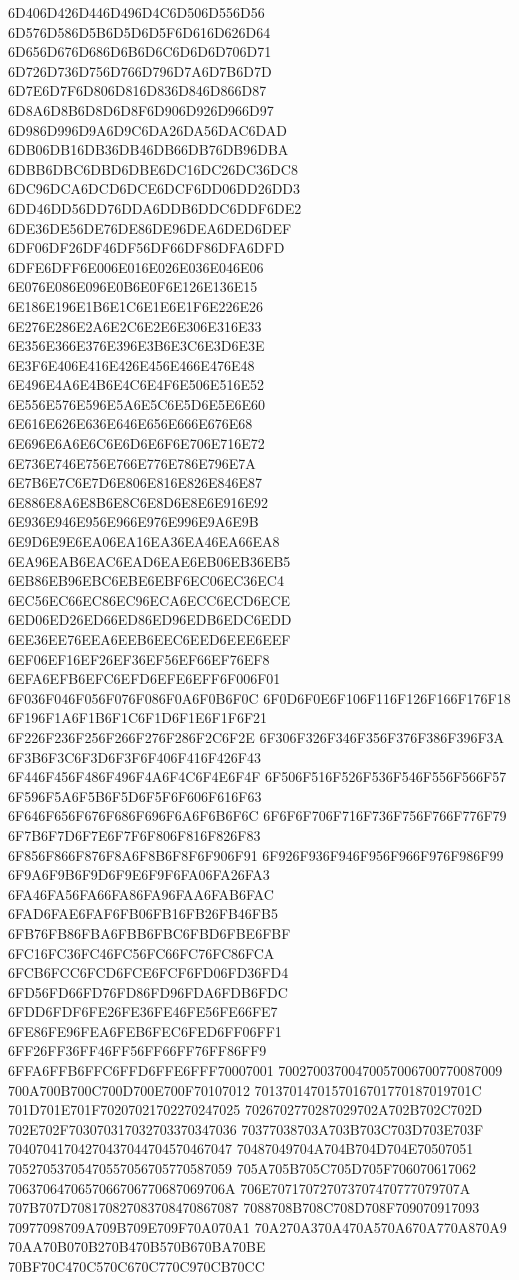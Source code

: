 6D406D426D446D496D4C6D506D556D56
6D576D586D5B6D5D6D5F6D616D626D64
6D656D676D686D6B6D6C6D6D6D706D71
6D726D736D756D766D796D7A6D7B6D7D
6D7E6D7F6D806D816D836D846D866D87
6D8A6D8B6D8D6D8F6D906D926D966D97
6D986D996D9A6D9C6DA26DA56DAC6DAD
6DB06DB16DB36DB46DB66DB76DB96DBA
6DBB6DBC6DBD6DBE6DC16DC26DC36DC8
6DC96DCA6DCD6DCE6DCF6DD06DD26DD3
6DD46DD56DD76DDA6DDB6DDC6DDF6DE2
6DE36DE56DE76DE86DE96DEA6DED6DEF
6DF06DF26DF46DF56DF66DF86DFA6DFD
6DFE6DFF6E006E016E026E036E046E06
6E076E086E096E0B6E0F6E126E136E15
6E186E196E1B6E1C6E1E6E1F6E226E26
6E276E286E2A6E2C6E2E6E306E316E33
6E356E366E376E396E3B6E3C6E3D6E3E
6E3F6E406E416E426E456E466E476E48
6E496E4A6E4B6E4C6E4F6E506E516E52
6E556E576E596E5A6E5C6E5D6E5E6E60
6E616E626E636E646E656E666E676E68
6E696E6A6E6C6E6D6E6F6E706E716E72
6E736E746E756E766E776E786E796E7A
6E7B6E7C6E7D6E806E816E826E846E87
6E886E8A6E8B6E8C6E8D6E8E6E916E92
6E936E946E956E966E976E996E9A6E9B
6E9D6E9E6EA06EA16EA36EA46EA66EA8
6EA96EAB6EAC6EAD6EAE6EB06EB36EB5
6EB86EB96EBC6EBE6EBF6EC06EC36EC4
6EC56EC66EC86EC96ECA6ECC6ECD6ECE
6ED06ED26ED66ED86ED96EDB6EDC6EDD
6EE36EE76EEA6EEB6EEC6EED6EEE6EEF
6EF06EF16EF26EF36EF56EF66EF76EF8
6EFA6EFB6EFC6EFD6EFE6EFF6F006F01
6F036F046F056F076F086F0A6F0B6F0C
6F0D6F0E6F106F116F126F166F176F18
6F196F1A6F1B6F1C6F1D6F1E6F1F6F21
6F226F236F256F266F276F286F2C6F2E
6F306F326F346F356F376F386F396F3A
6F3B6F3C6F3D6F3F6F406F416F426F43
6F446F456F486F496F4A6F4C6F4E6F4F
6F506F516F526F536F546F556F566F57
6F596F5A6F5B6F5D6F5F6F606F616F63
6F646F656F676F686F696F6A6F6B6F6C
6F6F6F706F716F736F756F766F776F79
6F7B6F7D6F7E6F7F6F806F816F826F83
6F856F866F876F8A6F8B6F8F6F906F91
6F926F936F946F956F966F976F986F99
6F9A6F9B6F9D6F9E6F9F6FA06FA26FA3
6FA46FA56FA66FA86FA96FAA6FAB6FAC
6FAD6FAE6FAF6FB06FB16FB26FB46FB5
6FB76FB86FBA6FBB6FBC6FBD6FBE6FBF
6FC16FC36FC46FC56FC66FC76FC86FCA
6FCB6FCC6FCD6FCE6FCF6FD06FD36FD4
6FD56FD66FD76FD86FD96FDA6FDB6FDC
6FDD6FDF6FE26FE36FE46FE56FE66FE7
6FE86FE96FEA6FEB6FEC6FED6FF06FF1
6FF26FF36FF46FF56FF66FF76FF86FF9
6FFA6FFB6FFC6FFD6FFE6FFF70007001
70027003700470057006700770087009
700A700B700C700D700E700F70107012
7013701470157016701770187019701C
701D701E701F70207021702270247025
7026702770287029702A702B702C702D
702E702F703070317032703370347036
70377038703A703B703C703D703E703F
70407041704270437044704570467047
70487049704A704B704D704E70507051
70527053705470557056705770587059
705A705B705C705D705F706070617062
7063706470657066706770687069706A
706E707170727073707470777079707A
707B707D708170827083708470867087
7088708B708C708D708F709070917093
70977098709A709B709E709F70A070A1
70A270A370A470A570A670A770A870A9
70AA70B070B270B470B570B670BA70BE
70BF70C470C570C670C770C970CB70CC
